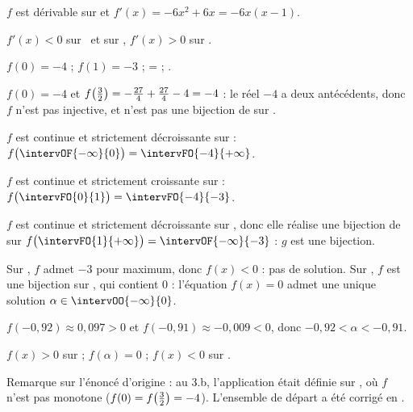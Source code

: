 \begin{corrigeprof}[20]
\be
\item $f$ est dérivable sur \R et $f'(x)=-6x^2+6x=-6x(x-1)$.
\par $f'(x)<0$ sur \, et sur , $f'(x)>0$ sur .
\par $f(0)=-4$ ; $f(1)=-3$ ; = ; .
\begin{center}
\end{center}
\item $f(0)=-4$ et $f\big(\frac{3}{2}\big)=-\frac{27}{4}+\frac{27}{4}-4=-4$ : le réel $-4$ a deux antécédents, donc $f$ n'est pas injective, et n'est pas une bijection de \R sur \R.
\item \be \item $f$ est continue et strictement décroissante sur  : $f\big(\intervOF{-\infty}{0}\big)=\intervFO{-4}{+\infty}$.
	\par $f$ est continue et strictement croissante sur  : $f\big(\intervFO{0}{1}\big)=\intervFO{-4}{-3}$.
	\item $f$ est continue et strictement décroissante sur , donc elle réalise une bijection de  sur $f\big(\intervFO{1}{+\infty}\big)=\intervOF{-\infty}{-3}$ : $g$ est une bijection.\ee
\item \be \item Sur , $f$ admet $-3$ pour maximum, donc $f(x)<0$ : pas de solution. Sur , $f$ est une bijection sur , qui contient $0$ : l'équation $f(x)=0$ admet une unique solution $\alpha\in\intervOO{-\infty}{0}$.
	\par $f(-0{,}92)\approx 0{,}097>0$ et $f(-0{,}91)\approx -0{,}009<0$, donc $-0{,}92<\alpha<-0{,}91$.
	\item $f(x)>0$ sur \intervOO{-\infty}{\alpha} ; $f(\alpha)=0$ ; $f(x)<0$ sur \intervOO{\alpha}{+\infty}.\ee
\ee
\end{corrigeprof}
\begin{noteprof}
Remarque sur l'énoncé d'origine : au 3.b, l'application était définie sur , où $f$ n'est pas monotone ($f(0)=f\big(\frac{3}{2}\big)=-4$). L'ensemble de départ a été corrigé en .
\end{noteprof}
